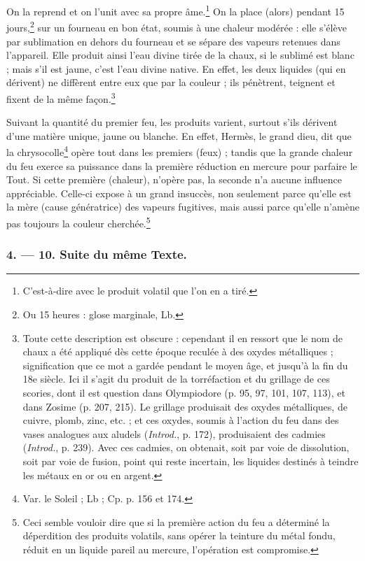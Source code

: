 \documentclass[a4paper, 11pt, oneside, polutonikogreek, french]{article}
\begin{document}
On la reprend et on l'unit avec sa propre âme.\footnote{C'est-à-dire avec le produit volatil que l'on en a tiré.} On la place (alors) pendant 15 jours,\footnote{Ou 15 heures : glose marginale, Lb.} sur un fourneau en bon état, soumis à une chaleur modérée : elle s'élève par sublimation en dehors du fourneau et se sépare des vapeurs retenues dans l'appareil. Elle produit ainsi l'eau divine tirée de la chaux, si le sublimé est blanc ; mais s'il est jaune, c'est l'eau divine native. En effet, les deux liquides (qui en dérivent) ne diffèrent entre eux que par la couleur ; ils pénètrent, teignent et fixent de la même façon.\footnote{Toute cette description est obscure : cependant il en ressort que le nom de chaux a été appliqué dès cette époque reculée à des oxydes métalliques ; signification que ce mot a gardée pendant le moyen âge, et jusqu'à la fin du 18e siècle. Ici il s'agit du produit de la torréfaction et du grillage de ces scories, dont il est question dans Olympiodore (p. 95, 97, 101, 107, 113), et dans Zosime (p. 207, 215). Le grillage produisait des oxydes métalliques, de cuivre, plomb, zinc, etc. ; et ces oxydes, soumis à l'action du feu dans des vases analogues aux aludels (\emph{Introd.}, p. 172), produisaient des cadmies (\emph{Introd.}, p. 239). Avec ces cadmies, on obtenait, soit par voie de dissolution, soit par voie de fusion, point qui reste incertain, les liquides destinés à teindre les métaux en or ou en argent.}

Suivant la quantité du premier feu, les produits varient, surtout s'ils dérivent d'une matière unique, jaune ou blanche. En effet, Hermès, le grand dieu, dit que la chrysocolle\footnote{Var. le Soleil ; Lb ; Cp. p. 156 et 174.} opère tout dans les premiers (feux) ; tandis que la grande chaleur du feu exerce sa puissance dans la première réduction en mercure pour parfaire le Tout. Si cette première (chaleur), n'opère pas, la seconde n'a aucune influence appréciable. Celle-ci expose à un grand insuccès, non seulement parce qu'elle est la mère (cause génératrice) des vapeurs fugitives, mais aussi parce qu'elle n'amène pas toujours la couleur cherchée.\footnote{Ceci semble vouloir dire que si la première action du feu a déterminé la déperdition des produits volatils, sans opérer la teinture du métal fondu, réduit en un liquide pareil au mercure, l'opération est compromise.}

\bigskip
\centerline{\EightStarTaper}
\centerline{\EightStarTaper\EightStarTaper}
\bigskip

\subsubsection{4. --- 10. Suite du même Texte.}
\end{document}
